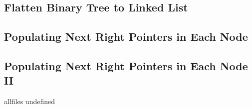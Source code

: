 \documentclass{article}
\begin{document}
\begin{CJK}{UTF8}{gbsn}     %

\else

\subsection{Flatten Binary Tree to Linked List}    

\subsection{Populating Next Right Pointers in Each Node}    

\subsection{Populating Next Right Pointers in Each Node II}    


\fi

\ifx allfiles undefined
\end{CJK}
\end{document}
